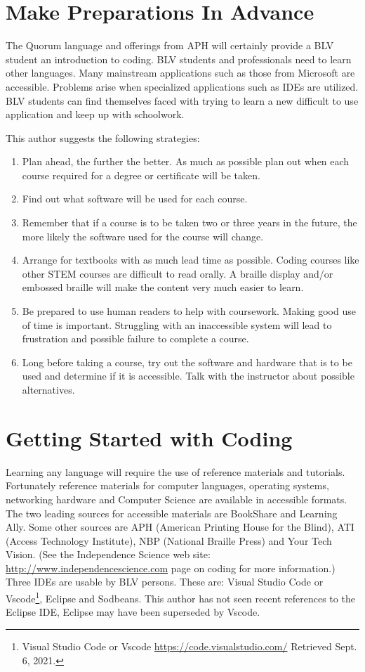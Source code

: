 \documentclass[11.5pt]{sig-alternate}
\begin{document}
\begin{large}
\section*{Make Preparations In Advance }
The Quorum language and offerings from APH will certainly provide a BLV student an introduction to coding. BLV students and professionals need to learn other languages. Many mainstream applications such as those from Microsoft are accessible. Problems arise when specialized applications such as IDEs are utilized. BLV students can find themselves faced with trying to learn a new difficult to use application and keep up with schoolwork.

This author suggests the following strategies:

\begin{enumerate}
    \item Plan ahead, the further the better. As much as possible plan out when each course required for a degree or certificate will be taken.
    \item Find out what software will be used for each course.
    \item Remember that if a course is to be taken two or three years in the future, the more likely the software used for the course will change.
    \item Arrange for textbooks with as much lead time as possible. Coding courses like other STEM courses are difficult to read orally. A braille display and/or embossed braille will make the content very much easier to learn.
    \item Be prepared to use human readers to help with coursework. Making good use of time is important. Struggling with an inaccessible system will lead to frustration and possible failure to complete a course.
    \item Long before taking a course, try out the software and hardware that is to be used and determine if it is accessible. Talk with the instructor about possible alternatives.
\end{enumerate}

\section*{Getting Started with Coding}
Learning any language will require the use of reference materials and tutorials. Fortunately reference materials for computer languages, operating systems, networking hardware and Computer Science are available in accessible formats. The two leading sources for accessible materials are BookShare and Learning Ally. Some other sources are APH (American Printing House for the Blind), ATI (Access Technology Institute), NBP (National Braille Press) and Your Tech Vision. (See the Independence Science web site: \url{http://www.independencescience.com} page on coding for more information.) Three IDEs are usable by BLV persons. These are: Visual Studio Code or Vscode\footnote{Visual Studio Code or Vscode \url{https://code.visualstudio.com/} Retrieved Sept. 6, 2021.}, Eclipse and Sodbeans. This author has not seen recent references to the Eclipse IDE, Eclipse may have been superseded by Vscode.


\end{large}
\end{document}
